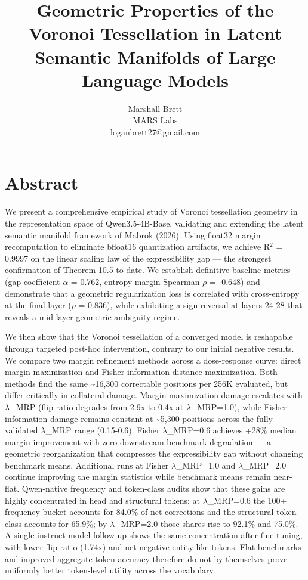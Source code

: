 \documentclass[
  11pt,
]{article}
\title{Geometric Properties of the Voronoi Tessellation in Latent
Semantic Manifolds of Large Language Models}
\author{Marshall Brett\\
MARS Labs\\
loganbrett27@gmail.com}
\date{}
\begin{document}
\maketitle

\hypertarget{abstract}{%
\section*{Abstract}\label{abstract}}

We present a comprehensive empirical study of Voronoi tessellation
geometry in the representation space of Qwen3.5-4B-Base, validating and
extending the latent semantic manifold framework of Mabrok (2026). Using
float32 margin recomputation to eliminate bfloat16 quantization
artifacts, we achieve R$^2$ = 0.9997 on the linear scaling law of the
expressibility gap --- the strongest confirmation of Theorem 10.5 to
date. We establish definitive baseline metrics (gap coefficient $\alpha$ =
0.762, entropy-margin Spearman $\rho$ = -0.648) and demonstrate that a
geometric regularization loss is correlated with cross-entropy at the
final layer ($\rho$ = 0.836), while exhibiting a sign reversal at layers
24-28 that reveals a mid-layer geometric ambiguity regime.

We then show that the Voronoi tessellation of a converged model is
reshapable through targeted post-hoc intervention, contrary to our
initial negative results. We compare two margin refinement methods
across a dose-response curve: direct margin maximization and Fisher
information distance maximization. Both methods find the same
\textasciitilde16,300 correctable positions per 256K evaluated, but
differ critically in collateral damage. Margin maximization damage
escalates with $\lambda$\_MRP (flip ratio degrades from 2.9x to 0.4x at
$\lambda$\_MRP=1.0), while Fisher information damage remains constant at
\textasciitilde5,300 positions across the fully validated $\lambda$\_MRP range
(0.15-0.6). Fisher $\lambda$\_MRP=0.6 achieves +28\% median margin improvement
with zero downstream benchmark degradation --- a geometric
reorganization that compresses the expressibility gap without changing
benchmark means. Additional runs at Fisher $\lambda$\_MRP=1.0 and $\lambda$\_MRP=2.0
continue improving the margin statistics while benchmark means remain
near-flat. Qwen-native frequency and token-class audits show that these
gains are highly concentrated in head and structural tokens: at
$\lambda$\_MRP=0.6 the 100+ frequency bucket accounts for 84.0\% of net
corrections and the structural token class accounts for 65.9\%; by
$\lambda$\_MRP=2.0 those shares rise to 92.1\% and 75.0\%. A single
instruct-model follow-up shows the same concentration after fine-tuning,
with lower flip ratio (1.74x) and net-negative entity-like tokens. Flat
benchmarks and improved aggregate token accuracy therefore do not by
themselves prove uniformly better token-level utility across the
vocabulary.
\end{document}
